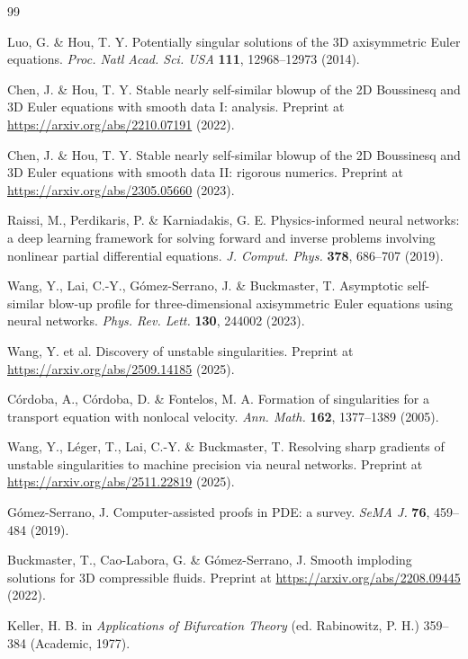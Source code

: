 \documentclass[11pt]{article}
\begin{document}
\begin{thebibliography}{99}
\setlength{\itemsep}{1pt}
\small

 Luo, G. \& Hou, T. Y. Potentially singular solutions of the 3D axisymmetric Euler equations.
\textit{Proc. Natl Acad. Sci. USA} \textbf{111}, 12968--12973 (2014).

 Chen, J. \& Hou, T. Y. Stable nearly self-similar blowup of the 2D Boussinesq and 3D Euler
equations with smooth data I: analysis. Preprint at \url{https://arxiv.org/abs/2210.07191} (2022).

 Chen, J. \& Hou, T. Y. Stable nearly self-similar blowup of the 2D Boussinesq and 3D Euler
equations with smooth data II: rigorous numerics. Preprint at \url{https://arxiv.org/abs/2305.05660} (2023).

 Raissi, M., Perdikaris, P. \& Karniadakis, G. E. Physics-informed neural networks: a deep
learning framework for solving forward and inverse problems involving nonlinear partial differential equations.
\textit{J. Comput. Phys.} \textbf{378}, 686--707 (2019).

 Wang, Y., Lai, C.-Y., G\'omez-Serrano, J. \& Buckmaster, T. Asymptotic self-similar blow-up
profile for three-dimensional axisymmetric Euler equations using neural networks. \textit{Phys. Rev. Lett.}
\textbf{130}, 244002 (2023).

 Wang, Y. et al. Discovery of unstable singularities. Preprint at
\url{https://arxiv.org/abs/2509.14185} (2025).

 C\'ordoba, A., C\'ordoba, D. \& Fontelos, M. A. Formation of singularities for a transport
equation with nonlocal velocity. \textit{Ann. Math.} \textbf{162}, 1377--1389 (2005).

 Wang, Y., L\'eger, T., Lai, C.-Y. \& Buckmaster, T. Resolving sharp gradients of unstable
singularities to machine precision via neural networks. Preprint at \url{https://arxiv.org/abs/2511.22819} (2025).

 G\'omez-Serrano, J. Computer-assisted proofs in PDE: a survey. \textit{SeMA J.}
\textbf{76}, 459--484 (2019).

 Buckmaster, T., Cao-Labora, G. \& G\'omez-Serrano, J. Smooth imploding solutions for 3D
compressible fluids. Preprint at \url{https://arxiv.org/abs/2208.09445} (2022).

 Keller, H. B. in \textit{Applications of Bifurcation Theory} (ed. Rabinowitz, P. H.) 359--384
(Academic, 1977).


\end{thebibliography}
\end{document}
